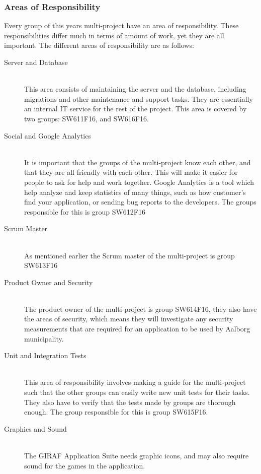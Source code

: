 \subsubsection*{Areas of Responsibility}
Every group of this years multi-project have an area of responsibility.
These responsibilities differ much in terms of amount of work, yet they are all important.
The different areas of responsibility are as follows:

\begin{description}
	\item[Server and Database] \hfill \\
	This area consists of maintaining the server and the database, including migrations and other maintenance and support tasks. They are essentially an internal IT service for the rest of the project. This area is covered by two groups: SW611F16, and SW616F16.
	\item[Social and Google Analytics] \hfill \\
	It is important that the groups of the multi-project know each other, and that they are all friendly with each other. 
	This will make it easier for people to ask for help and work together. 
	Google Analytics is a tool which help analyze and keep statistics of many things, such as how customer's find your application, or sending bug reports to the developers.
	The groups responsible for this is group SW612F16
	\item[Scrum Master] \hfill \\
	As mentioned earlier the Scrum master of the multi-project is group SW613F16
	\item[Product Owner and Security] \hfill \\
	The product owner of the multi-project is group SW614F16, they also have the areas of security, which means they will investigate any security measurements that are required for an application to be used by Aalborg municipality.
	\item[Unit and Integration Tests] \hfill \\
	This area of responsibility involves making a guide for the multi-project such that the other groups can easily write new unit tests for their tasks.
	They also have to verify that the tests made by groups are thorough enough.
	The group responsible for this is group SW615F16.
	\item[Graphics and Sound] \hfill \\
	The GIRAF Application Suite needs graphic icons, and may also require sound for the games in the application. 

\end{description}
